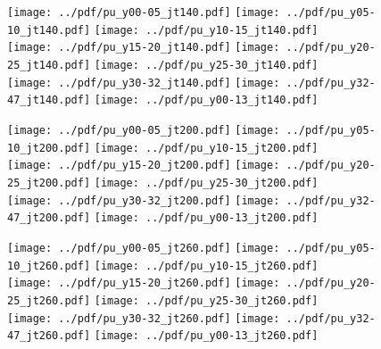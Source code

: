 \documentclass[landscape,10pt]{beamer} %
\begin{document}
\newpage

\begin{figure}[p]
\centering
\texttt{[image: ../pdf/pu\_y00-05\_jt140.pdf]}
\texttt{[image: ../pdf/pu\_y05-10\_jt140.pdf]}
\texttt{[image: ../pdf/pu\_y10-15\_jt140.pdf]}\\
\texttt{[image: ../pdf/pu\_y15-20\_jt140.pdf]}
\texttt{[image: ../pdf/pu\_y20-25\_jt140.pdf]}
\texttt{[image: ../pdf/pu\_y25-30\_jt140.pdf]}\\
\texttt{[image: ../pdf/pu\_y30-32\_jt140.pdf]}
\texttt{[image: ../pdf/pu\_y32-47\_jt140.pdf]}
\texttt{[image: ../pdf/pu\_y00-13\_jt140.pdf]}
\end{figure}

\newpage

\begin{figure}[p]
\centering
\texttt{[image: ../pdf/pu\_y00-05\_jt200.pdf]}
\texttt{[image: ../pdf/pu\_y05-10\_jt200.pdf]}
\texttt{[image: ../pdf/pu\_y10-15\_jt200.pdf]}\\
\texttt{[image: ../pdf/pu\_y15-20\_jt200.pdf]}
\texttt{[image: ../pdf/pu\_y20-25\_jt200.pdf]}
\texttt{[image: ../pdf/pu\_y25-30\_jt200.pdf]}\\
\texttt{[image: ../pdf/pu\_y30-32\_jt200.pdf]}
\texttt{[image: ../pdf/pu\_y32-47\_jt200.pdf]}
\texttt{[image: ../pdf/pu\_y00-13\_jt200.pdf]}
\end{figure}

\newpage

\begin{figure}[p]
\centering
\texttt{[image: ../pdf/pu\_y00-05\_jt260.pdf]}
\texttt{[image: ../pdf/pu\_y05-10\_jt260.pdf]}
\texttt{[image: ../pdf/pu\_y10-15\_jt260.pdf]}\\
\texttt{[image: ../pdf/pu\_y15-20\_jt260.pdf]}
\texttt{[image: ../pdf/pu\_y20-25\_jt260.pdf]}
\texttt{[image: ../pdf/pu\_y25-30\_jt260.pdf]}\\
\texttt{[image: ../pdf/pu\_y30-32\_jt260.pdf]}
\texttt{[image: ../pdf/pu\_y32-47\_jt260.pdf]}
\texttt{[image: ../pdf/pu\_y00-13\_jt260.pdf]}
\end{figure}
\end{document}
